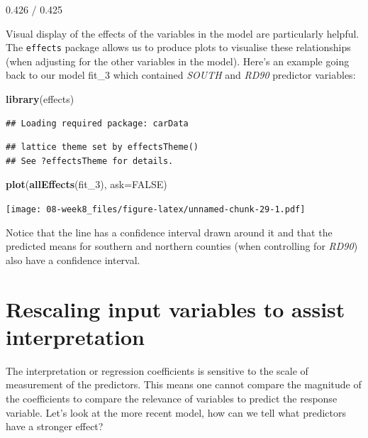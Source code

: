 \documentclass[]{book}
\newenvironment{Shaded}{\begin{snugshade}}{\end{snugshade}}
\newcommand{\DataTypeTok}[1]{\textcolor[rgb]{0.13,0.29,0.53}{#1}}
\newcommand{\DecValTok}[1]{\textcolor[rgb]{0.00,0.00,0.81}{#1}}
\newcommand{\KeywordTok}[1]{\textcolor[rgb]{0.13,0.29,0.53}{\textbf{#1}}}
\newcommand{\NormalTok}[1]{#1}
\newcommand{\OtherTok}[1]{\textcolor[rgb]{0.56,0.35,0.01}{#1}}
\begin{document}
0.426 / 0.425

Visual display of the effects of the variables in the model are particularly helpful. The \texttt{effects} package allows us to produce plots to visualise these relationships (when adjusting for the other variables in the model). Here's an example going back to our model fit\_3 which contained \emph{SOUTH} and \emph{RD90} predictor variables:

\begin{Shaded}
\begin{Highlighting}[]
\KeywordTok{library}\NormalTok{(effects)}
\end{Highlighting}
\end{Shaded}

\begin{verbatim}
## Loading required package: carData
\end{verbatim}

\begin{verbatim}
## lattice theme set by effectsTheme()
## See ?effectsTheme for details.
\end{verbatim}

\begin{Shaded}
\begin{Highlighting}[]
\KeywordTok{plot}\NormalTok{(}\KeywordTok{allEffects}\NormalTok{(fit_}\DecValTok{3}\NormalTok{), }\DataTypeTok{ask=}\OtherTok{FALSE}\NormalTok{)}
\end{Highlighting}
\end{Shaded}

\texttt{[image: 08-week8\_files/figure-latex/unnamed-chunk-29-1.pdf]}

Notice that the line has a confidence interval drawn around it and that the predicted means for southern and northern counties (when controlling for \emph{RD90}) also have a confidence interval.

\hypertarget{rescaling-input-variables-to-assist-interpretation}{%
\section{Rescaling input variables to assist interpretation}\label{rescaling-input-variables-to-assist-interpretation}}

The interpretation or regression coefficients is sensitive to the scale of measurement of the predictors. This means one cannot compare the magnitude of the coefficients to compare the relevance of variables to predict the response variable. Let's look at the more recent model, how can we tell what predictors have a stronger effect?
\end{document}
